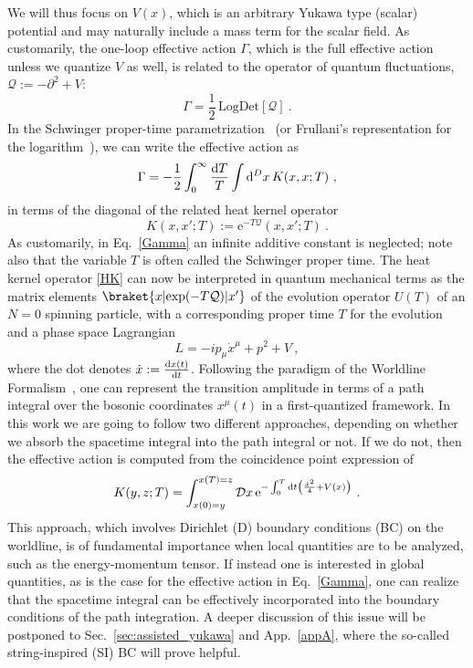 \documentclass[12pt,a4paper]{article}
\numberwithin{equation}{section}
\numberwithin{equation}{section}
\def \Q{{\mathcal{Q}}}
\begin{document}
We will thus focus on $V(x)$, which is an arbitrary Yukawa type (scalar) potential and may naturally include a mass term for the scalar field. 
As customarily, the one-loop effective action $\Gamma$, which is the full effective action unless we quantize $V$ as well, is related to the operator of quantum fluctuations, $\Q:=-\partial^2 + V$:
\begin{equation}
\Gamma=\frac12 \,\mathrm{Log} \mathrm{Det}[\Q]\ .
\end{equation}
In the Schwinger proper-time parametrization~\cite{DeWitt:2003pm} (or Frullani's 
representation for the logarithm~\cite{Jeffreys}), we can write the effective action as
\begin{equation} \label{Gamma}
\Gamma=-\frac12 \int_{0}^{\infty}\frac{{\rm d}T}{T}\int {\rm d}^Dx \, K(x,x;T)\ ,
\end{equation}
in terms of the diagonal of the related heat kernel operator
\begin{equation} \label{HK}
K(x,x';T):=\mathrm{e}^{-T\Q}(x,x';T)\ .
\end{equation}
As customarily, in Eq.~\eqref{Gamma} an infinite additive constant is neglected; note also that the variable $T$ is often called the Schwinger proper time. The heat kernel operator \eqref{HK} can now be interpreted in quantum mechanical terms as the matrix elements $\braket{x|\mathrm{exp}(-T\Q)|x'}$ of the evolution operator $U(T)$ of an $N=0$ spinning particle, with a corresponding proper time $T$ for the evolution and a phase space Lagrangian
\begin{equation}
L=-ip_\mu\dot{x}^\mu+p^2+ V\ ,
\end{equation}
where the dot denotes $\dot{x}:=\frac{{\rm d}x(t)}{{\rm d}t}$.
Following the paradigm of the Worldline Formalism~\cite{Schubert:2001he}, one can represent the transition amplitude in terms of a path integral over the bosonic coordinates $x^\mu(t)$ in a first-quantized framework.
In this work we are going to follow two different approaches, depending on whether we absorb the spacetime integral into the path integral or not.
If we do not, then the effective action is computed from the coincidence point expression of
\begin{equation} \label{path}
K(y,z;T)=\int_{x(0)=y}^{x(T)=z} \mathcal{D}x \, \mathrm{e}^{-\int_{0}^{T} {\rm d}t \left( \frac{\dot{x}^2}{4}+ V(x) \right)}\ .
\end{equation}
This approach, which involves Dirichlet (D) boundary conditions (BC) on the worldline, is of fundamental importance when local quantities are to be analyzed, such as the energy-momentum tensor. If instead one is interested in global quantities, as is the case for the effective action in Eq.~\eqref{Gamma}, one can realize that the spacetime integral can be effectively incorporated into the boundary conditions of the path integration. 
A deeper discussion of this issue will be postponed to Sec.~\ref{sec:assisted_yukawa} and App.~\ref{appA}, where the so-called 
string-inspired (SI) BC will prove helpful.
\end{document}
